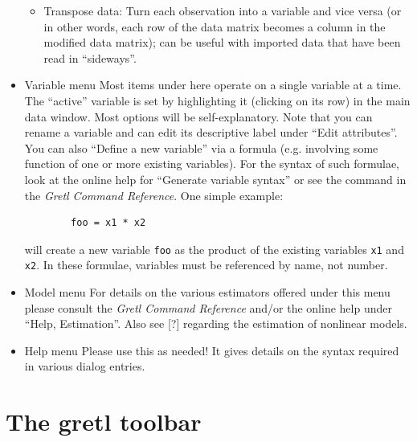 \begin{itemize}
\begin{itemize}
  \item \textsf{Transpose data}: Turn each observation into a variable
    and vice versa (or in other words, each row of the data matrix
    becomes a column in the modified data matrix); can be useful with
    imported data that have been read in ``sideways''.
	    
  \end{itemize}


\item \textsf{Variable menu} Most items under here operate on a single
  variable at a time.  The ``active'' variable is set by highlighting
  it (clicking on its row) in the main data window.  Most options will
  be self-explanatory.  Note that you can rename a variable and can
  edit its descriptive label under ``Edit attributes''. You can also
  ``Define a new variable'' via a formula (e.g. involving some
  function of one or more existing variables). For the syntax of such
  formulae, look at the online help for ``Generate variable syntax''
  or see the  command in the \emph{Gretl Command Reference}.
  One simple example:
	  
\begin{verbatim} 
	    foo = x1 * x2\end{verbatim}
          will create a new variable
	  \verb+foo+ as the product of the existing
	  variables \verb+x1+ and \verb+x2+.
	  In these formulae, variables must be referenced by name, not
	  number.
        \item \textsf{Model menu} For details on the various
          estimators offered under this menu please consult the
          \emph{Gretl Command Reference} and/or the online help under
          ``Help, Estimation''.  Also see [?] regarding the estimation
          of nonlinear models.
        \item \textsf{Help menu} Please use this as needed! It gives
          details on the syntax required in various dialog entries.
        \end{itemize}



\section{The gretl toolbar}
\label{toolbar}

